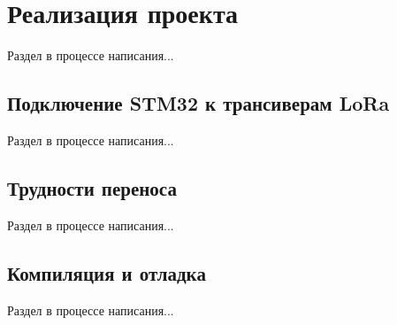 \section{Реализация проекта}

Раздел в процессе написания...

\subsection{Подключение STM32 к трансиверам LoRa}
Раздел в процессе написания...


\subsection{Трудности переноса}
Раздел в процессе написания...


\subsection{Компиляция и отладка}
Раздел в процессе написания...




